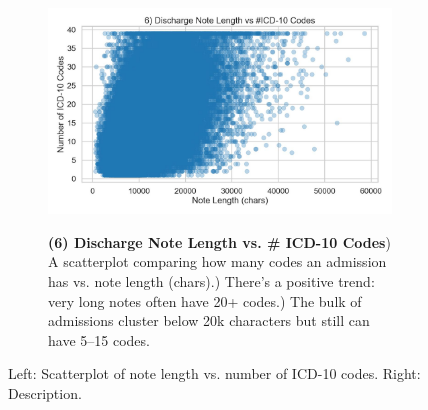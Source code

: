 \documentclass[12pt,a4paper]{report}
\begin{document}
\begin{figure}[ht!]
    \centering
    \begin{subfigure}{0.42\textwidth}
        \includegraphics[width=\linewidth]{mimic_plots/plot6.jpg}
    \end{subfigure}\hfill
    \begin{subfigure}{0.54\textwidth}
        \footnotesize
        \textbf{(6) Discharge Note Length vs. \# ICD-10 Codes}) A scatterplot comparing how many codes an admission has vs. note length (chars).) There's a positive trend: very long notes often have 20+ codes.) The bulk of admissions cluster below 20k characters but still can have 5--15 codes.
    \end{subfigure}
    \caption{Left: Scatterplot of note length vs. number of ICD-10 codes. Right: Description.}
    \label{fig:plot6}
\end{figure}
\end{document}
